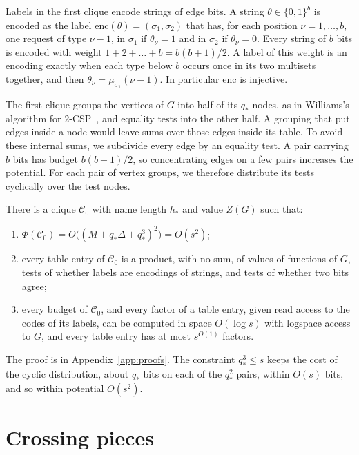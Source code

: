 \documentclass[11pt]{article}
\theoremstyle{definition}
\theoremstyle{definition}
\theoremstyle{remark}
\begin{document}
Labels in the first clique encode strings of edge bits. A string $\theta\in\{0,1\}^b$ is encoded as the label $\mathrm{enc}(\theta)=(\sigma_1,\sigma_2)$ that has, for each position $\nu=1,\dots,b$, one request of type $\nu-1$, in $\sigma_1$ if $\theta_\nu=1$ and in $\sigma_2$ if $\theta_\nu=0$. Every string of $b$ bits is encoded with weight $1+2+\dots+b=b(b+1)/2$. A label of this weight is an encoding exactly when each type below $b$ occurs once in its two multisets together, and then $\theta_\nu=\mu_{\sigma_1}(\nu-1)$. In particular $\mathrm{enc}$ is injective.

The first clique groups the vertices of $G$ into half of its $q_*$ nodes, as in Williams's algorithm for $2$-CSP~\cite{Wil05}, and equality tests into the other half. A grouping that put edges inside a node would leave sums over those edges inside its table. To avoid these internal sums, we subdivide every edge by an equality test. A pair carrying $b$ bits has budget $b(b+1)/2$, so concentrating edges on a few pairs increases the potential. For each pair of vertex groups, we therefore distribute its tests cyclically over the test nodes.

\begin{lemma}\label{lem:top}
There is a clique $\mathcal C_0$ with name length $h_*$ and value $Z(G)$ such that:
\begin{enumerate}[label=(\alph*)]
\item $\Phi(\mathcal C_0)=O\bigl((M+q_*\Delta+q_*^3)^2\bigr)=O(s^2)$;
\item every table entry of $\mathcal C_0$ is a product, with no sum, of values of functions of $G$, tests of whether labels are encodings of strings, and tests of whether two bits agree;
\item every budget of $\mathcal C_0$, and every factor of a table entry, given read access to the codes of its labels, can be computed in space $O(\log s)$ with logspace access to $G$, and every table entry has at most $s^{O(1)}$ factors.
\end{enumerate}
\end{lemma}

The proof is in Appendix~\ref{app:proofs}. The constraint $q_*^3\le s$ keeps the cost of the cyclic distribution, about $q_*$ bits on each of the $q_*^2$ pairs, within $O(s)$ bits, and so within potential $O(s^2)$.

\section{Crossing pieces}\label{sec:pieces}
\end{document}
